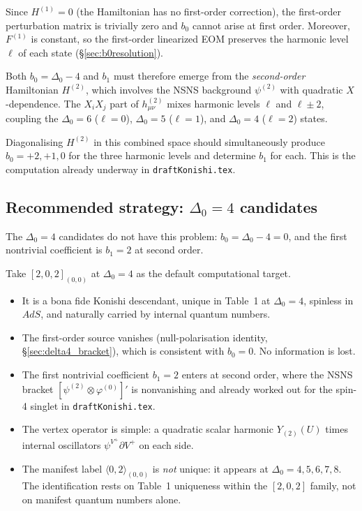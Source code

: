 \documentclass[12pt]{article}
\newcommand{\D}{\ensuremath{\Delta}}
\begin{document}
Since $H^{(1)}=0$ (the Hamiltonian has no first-order correction), the first-order
perturbation matrix is trivially zero and $b_0$ cannot arise at first order.
Moreover, $F^{(1)}$ is constant, so the first-order linearized EOM preserves the harmonic
level $\ell$ of each state (\S\ref{sec:b0resolution}).

Both $b_0=\D_0-4$ and $b_1$ must therefore emerge from the \emph{second-order} Hamiltonian
$H^{(2)}$, which involves the NSNS background $\psi^{(2)}$ with quadratic $X$-dependence.
The $X_iX_j$ part of $h^{(2)}_{\mu\nu}$ mixes harmonic levels $\ell$ and $\ell\pm 2$,
coupling the $\D_0=6$ ($\ell=0$), $\D_0=5$ ($\ell=1$), and $\D_0=4$ ($\ell=2$) states.

Diagonalising $H^{(2)}$ in this combined space should simultaneously produce $b_0=+2,+1,0$
for the three harmonic levels and determine $b_1$ for each. This is the computation already
underway in \texttt{draftKonishi.tex}.

\subsection{Recommended strategy: \texorpdfstring{$\D_0=4$}{Delta0=4} candidates}

The $\D_0=4$ candidates do not have this problem: $b_0=\D_0-4=0$, and the first nontrivial
coefficient is $b_1=2$ at second order.

Take $[2,0,2]_{(0,0)}$ at $\D_0=4$ as the default computational target.
\begin{itemize}
\item It is a bona fide Konishi descendant, unique in Table~1 at $\D_0=4$,
spinless in $AdS$, and naturally carried by internal quantum numbers.
\item The first-order source vanishes (null-polarisation identity, \S\ref{sec:delta4_bracket}),
which is consistent with $b_0=0$. No information is lost.
\item The first nontrivial coefficient $b_1=2$ enters at second order, where the NSNS bracket
$[\psi^{(2)}\otimes\varphi^{(0)}]'$ is nonvanishing and already worked out for the spin-4
singlet in \texttt{draftKonishi.tex}.
\item The vertex operator is simple: a quadratic scalar harmonic $Y_{(2)}(U)$ times internal
oscillators $\psi^{V^+}\partial V^+$ on each side.
\item The manifest label $\langle 0,2\rangle_{(0,0)}$ is \emph{not} unique: it appears at
$\D_0=4,5,6,7,8$. The identification rests on Table~1 uniqueness within the $[2,0,2]$
family, not on manifest quantum numbers alone.
\end{itemize}
\end{document}
